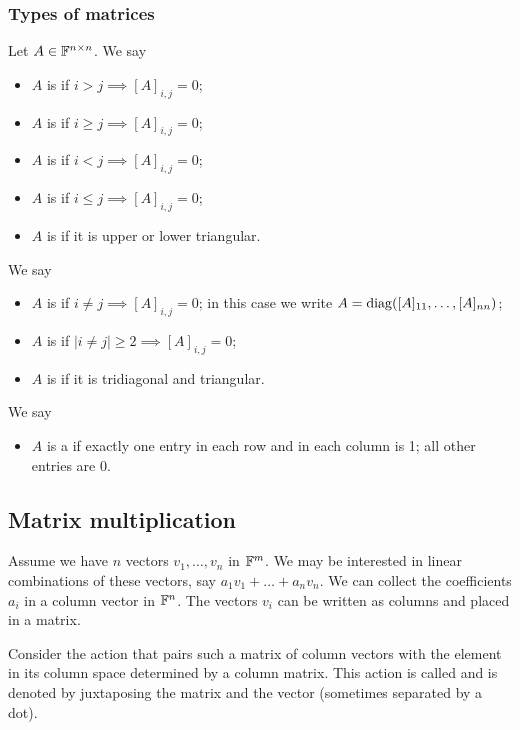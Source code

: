 \subsubsection{Types of matrices}
\begin{definition}
Let $A\in\mathbb{F}^{n\times n}$. We say
\begin{itemize}
\item $A$ is  if $i>j \implies [A]_{i,j} = 0$;
\item $A$ is  if $i\geq j \implies [A]_{i,j} = 0$;
\item $A$ is  if $i<j \implies [A]_{i,j} = 0$;
\item $A$ is  if $i\leq j \implies [A]_{i,j} = 0$;
\item $A$ is  if it is upper or lower triangular.
\end{itemize}
We say
\begin{itemize}
\item $A$ is  if $i\neq j \implies [A]_{i,j} = 0$; in this case we write $A = \operatorname{diag}([A]_{11},\ldots, [A]_{nn})$;
\item $A$ is  if $|i\neq j| \geq 2 \implies [A]_{i,j} = 0$;
\item $A$ is  if it is tridiagonal and triangular.
\end{itemize}
We say
\begin{itemize}
\item $A$ is a  if exactly one entry in each row and in each column is 1; all other entries are 0.
\end{itemize}
\end{definition}

\subsection{Matrix multiplication}
Assume we have $n$ vectors $v_1,\ldots, v_n$ in $\mathbb{F}^m$. We may be interested in linear combinations of these vectors, say $a_1v_1+\ldots + a_nv_n$. We can collect the coefficients $a_i$ in a column vector in $\mathbb{F}^n$. The vectors $v_i$ can be written as columns and placed in a matrix.

Consider the action that pairs such a matrix of column vectors with the element in its column space determined by a column matrix. This action is called  and is denoted by juxtaposing the matrix and the vector (sometimes separated by a dot).

